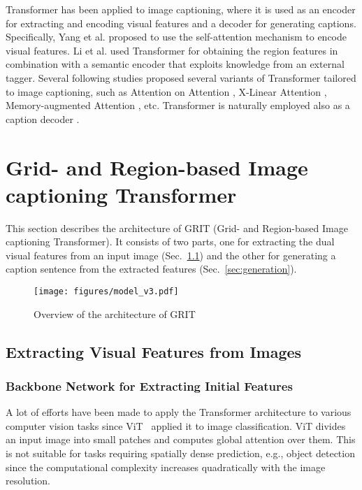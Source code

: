 \documentclass[runningheads]{llncs}
\begin{document}
Transformer has been applied to image captioning, where it is used as an encoder for extracting and encoding visual features and a decoder for generating captions. Specifically, Yang et al. \cite{yang2019learning} proposed to use the self-attention mechanism to encode visual features. Li et al. \cite{li2019entangled} used Transformer for obtaining the region features in combination with a semantic encoder that exploits knowledge from an external tagger. Several following studies proposed several variants of Transformer tailored to image captioning, such as Attention on Attention \cite{huang2019attention}, X-Linear Attention \cite{pan2020x}, Memory-augmented Attention \cite{cornia2020meshed}, etc. Transformer is naturally employed also as a caption decoder \cite{herdade2019image,guo2020normalized,luo2021dual,wang2021simvlm}.

\section{Grid- and Region-based Image captioning Transformer}
This section describes the architecture of GRIT (Grid- and Region-based Image captioning Transformer). It consists of two parts, one for extracting the dual visual features from an input image (Sec.~\ref{sec:extraction}) and the other for generating a caption sentence from the extracted features (Sec.~\ref{sec:generation}). 

\begin{figure}[t]
\begin{center}
\texttt{[image: figures/model\_v3.pdf]}
\end{center}
   \caption{Overview of the architecture of GRIT
   }
\label{fig:overview}
\end{figure}

\subsection{Extracting Visual Features from Images}
\label{sec:extraction}

\subsubsection{Backbone Network for Extracting Initial Features}

A lot of efforts have been made to apply the Transformer architecture to various computer vision tasks since ViT~\cite{dosovitskiy2020image} applied it to image classification. ViT divides an input image into small patches and computes global attention over them. This is not suitable for tasks requiring spatially dense prediction, e.g., object detection since the computational complexity increases quadratically with the image resolution.
\end{document}
